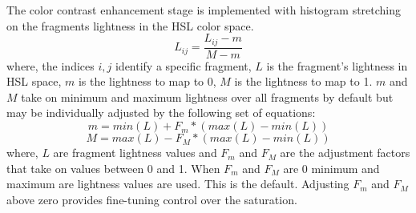 \documentclass[a4paper,10pt]{article}
\begin{document}
The color contrast enhancement stage is implemented with histogram stretching on the fragments lightness in the HSL color space.
\begin{equation}
L_{ij} = \frac{L_{ij} - m}{M - m}
\end{equation}
where, the indices $i,j$ identify a specific fragment, $L$ is the fragment's lightness in HSL space, $m$ is the lightness to map to 0, $M$ is the lightness to map to 1. $m$ and $M$ take on minimum and maximum lightness over all fragments by default but may be individually adjusted by the following set of equations:
\begin{equation}
m = min(L) + F_{m} * ( max(L) - min(L) )
\end{equation}
\begin{equation}
M = max(L) - F_{M} * ( max(L) - min(L) ) 
\end{equation}
where, $L$ are fragment lightness values and $F_m$ and $F_M$ are the adjustment factors that take on values between 0 and 1. When $F_m$ and $F_M$ are 0 minimum and maximum are lightness values are used. This is the default. Adjusting $F_m$ and $F_M$ above zero provides fine-tuning control over the saturation.

\FloatBarrier
\end{document}
